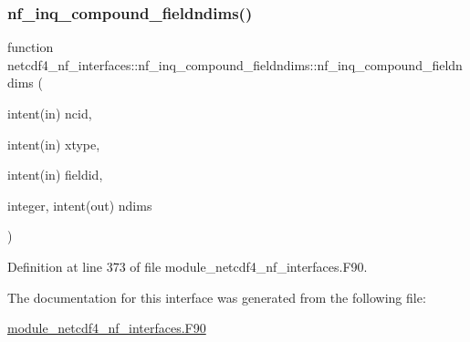 \subsubsection{\texorpdfstring{nf\+\_\+inq\+\_\+compound\+\_\+fieldndims()}{nf\_inq\_compound\_fieldndims()}}
{\footnotesize\ttfamily function netcdf4\+\_\+nf\+\_\+interfaces\+::nf\+\_\+inq\+\_\+compound\+\_\+fieldndims\+::nf\+\_\+inq\+\_\+compound\+\_\+fieldndims (\begin{DoxyParamCaption}\item[{intent(in)}]{ncid,  }\item[{intent(in)}]{xtype,  }\item[{intent(in)}]{fieldid,  }\item[{integer, intent(out)}]{ndims }\end{DoxyParamCaption})}



Definition at line 373 of file module\+\_\+netcdf4\+\_\+nf\+\_\+interfaces.\+F90.



The documentation for this interface was generated from the following file\+:\begin{DoxyCompactItemize}
\item 
\hyperlink{module__netcdf4__nf__interfaces_8F90}{module\+\_\+netcdf4\+\_\+nf\+\_\+interfaces.\+F90}\end{DoxyCompactItemize}
